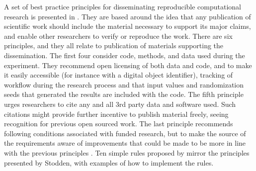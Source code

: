 A set of best practice principles for disseminating reproducible computational research is presented in \cite{stodden2014best-practices}. They are based around the idea that any publication of scientific work should include the material necessary to support its major claims, and enable other researchers to verify or reproduce the work. There are six principles, and they all relate to publication of materials supporting the dissemination. The first four consider code, methods, and data used during the experiment. They recommend open licensing of both data and code, and to make it easily accessible (for instance with a digital object identifier), tracking of workflow during the research process and that input values and randomization seeds that generated the results are included with the code. The fifth principle urges researchers to cite any and all 3rd party data and software used. Such citations might provide further incentive to publish material freely, seeing recognition for previous open sourced work. The last principle recommends following conditions associated with funded research, but to make the source of the requirements aware of improvements that could be made to be more in line with the previous principles \citep{stodden2014best-practices}. Ten simple rules proposed by \cite{Sandve_2013} mirror the principles presented by Stodden, with examples of how to implement the rules.
